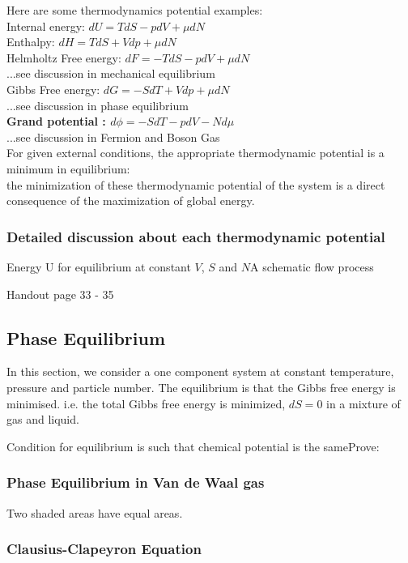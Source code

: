 \documentclass[12pt,a4paper]{article}
\begin{document}
    Here are some thermodynamics potential examples:\\
    Internal energy: $dU = TdS - pdV+\mu dN$\\
    Enthalpy: $dH = TdS + Vdp +\mu dN$\\
    Helmholtz Free energy: $dF = -TdS -pdV + \mu dN$\\ ...see discussion in mechanical equilibrium \\
    Gibbs Free energy: $dG = -SdT + Vdp +\mu dN$\\ ...see discussion in phase equilibrium \\
    \textbf{Grand potential : $d\phi = -SdT -pdV - Nd\mu$}\\ ...see discussion in Fermion and Boson Gas \\
    For given external conditions, the appropriate thermodynamic potential is a minimum in equilibrium:\\
    the minimization of these thermodynamic potential of the system is a direct consequence of the maximization of global energy.
    \subsubsection{Detailed discussion about each thermodynamic potential}
    \begin{example}
        {Energy U for equilibrium at constant $V$, $S$ and $N$}{A schematic flow process}
    \end{example}
    Handout page 33 - 35
    \subsection {Phase Equilibrium}
    In this section, we consider a one component system at constant temperature, pressure and particle number. The equilibrium is that the Gibbs free energy is minimised.
    i.e. the total Gibbs free energy is minimized, $dS =0$ in a mixture of gas and liquid.\\
    \begin{theorem}
        {Condition for equilibrium is such that chemical potential is the same}{Prove:}
    \end{theorem}
    \subsubsection {Phase Equilibrium in Van de Waal gas}
    Two shaded areas have equal areas.
    
    \subsubsection {Clausius-Clapeyron Equation}
\end{document}
